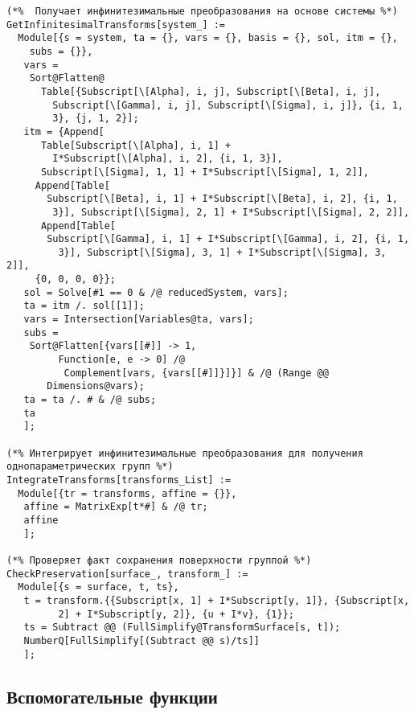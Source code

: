 \documentclass[../main.tex]{subfiles}
\begin{document}
\begin{lstlisting}
(*%  Получает инфинитезимальные преобразования на основе системы %*)
GetInfinitesimalTransforms[system_] :=
  Module[{s = system, ta = {}, vars = {}, basis = {}, sol, itm = {}, 
    subs = {}},
   vars = 
    Sort@Flatten@
      Table[{Subscript[\[Alpha], i, j], Subscript[\[Beta], i, j], 
        Subscript[\[Gamma], i, j], Subscript[\[Sigma], i, j]}, {i, 1, 
        3}, {j, 1, 2}];
   itm = {Append[
      Table[Subscript[\[Alpha], i, 1] + 
        I*Subscript[\[Alpha], i, 2], {i, 1, 3}], 
      Subscript[\[Sigma], 1, 1] + I*Subscript[\[Sigma], 1, 2]], 
     Append[Table[
       Subscript[\[Beta], i, 1] + I*Subscript[\[Beta], i, 2], {i, 1, 
        3}], Subscript[\[Sigma], 2, 1] + I*Subscript[\[Sigma], 2, 2]],
      Append[Table[
       Subscript[\[Gamma], i, 1] + I*Subscript[\[Gamma], i, 2], {i, 1,
         3}], Subscript[\[Sigma], 3, 1] + I*Subscript[\[Sigma], 3, 2]],
     {0, 0, 0, 0}};
   sol = Solve[#1 == 0 & /@ reducedSystem, vars];
   ta = itm /. sol[[1]];
   vars = Intersection[Variables@ta, vars];
   subs = 
    Sort@Flatten[{vars[[#]] -> 1, 
         Function[e, e -> 0] /@ 
          Complement[vars, {vars[[#]]}]}] & /@ (Range @@ 
       Dimensions@vars);
   ta = ta /. # & /@ subs;
   ta
   ];

(*% Интегрирует инфинитезимальные преобразования для получения однопараметрических групп %*)
IntegrateTransforms[transforms_List] :=
  Module[{tr = transforms, affine = {}},
   affine = MatrixExp[t*#] & /@ tr;
   affine
   ];

(*% Проверяет факт сохранения поверхности группой %*)
CheckPreservation[surface_, transform_] :=
  Module[{s = surface, t, ts},
   t = transform.{{Subscript[x, 1] + I*Subscript[y, 1]}, {Subscript[x,
         2] + I*Subscript[y, 2]}, {u + I*v}, {1}};
   ts = Subtract @@ (FullSimplify@TransformSurface[s, t]);
   NumberQ[FullSimplify[(Subtract @@ s)/ts]]
   ];
\end{lstlisting}

\subsection{Вспомогательные функции}
\end{document}
